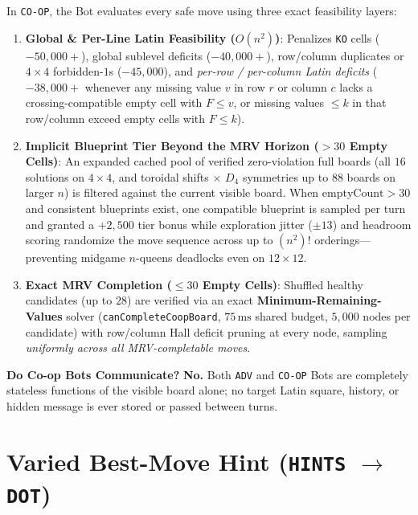 \documentclass[10pt,a4paper]{article}
\theoremstyle{remark}
\begin{document}
In \texttt{CO-OP}, the Bot evaluates every safe move using three exact feasibility layers:
\begin{enumerate}[nosep]
  \item \textbf{Global \& Per-Line Latin Feasibility ($O(n^2)$)}: Penalizes \texttt{KO} cells ($-50{,}000+$), global sublevel deficits ($-40{,}000+$), row/column duplicates or $4\times 4$ forbidden-$1$s ($-45{,}000$), and \emph{per-row / per-column Latin deficits} ($-38{,}000+$ whenever any missing value $v$ in row $r$ or column $c$ lacks a crossing-compatible empty cell with $F \le v$, or missing values $\le k$ in that row/column exceed empty cells with $F \le k$).
  \item \textbf{Implicit Blueprint Tier Beyond the MRV Horizon ($> 30$ Empty Cells)}: An expanded cached pool of verified zero-violation full boards (all $16$ solutions on $4\times 4$, and toroidal shifts $\times$ $D_4$ symmetries up to $88$ boards on larger $n$) is filtered against the current visible board. When $\mathrm{emptyCount} > 30$ and consistent blueprints exist, one compatible blueprint is sampled per turn and granted a $+2{,}500$ tier bonus while exploration jitter ($\pm 13$) and headroom scoring randomize the move sequence across up to $(n^2)!$ orderings---preventing midgame $n$-queens deadlocks even on $12 \times 12$.
  \item \textbf{Exact MRV Completion ($\le 30$ Empty Cells)}: Shuffled healthy candidates (up to $28$) are verified via an exact \textbf{Minimum-Remaining-Values} solver (\texttt{canComplete\allowbreak CoopBoard}, $75\,\mathrm{ms}$ shared budget, $5{,}000$ nodes per candidate) with row/column Hall deficit pruning at every node, sampling \emph{uniformly across all MRV-completable moves}.
\end{enumerate}

\textbf{Do Co-op Bots Communicate?} \textbf{No.} Both \texttt{ADV} and \texttt{CO-OP} Bots are completely stateless functions of the visible board alone; no target Latin square, history, or hidden message is ever stored or passed between turns.

\section{\texorpdfstring{Varied Best-Move Hint (\texttt{HINTS} $\to$ \texttt{DOT})}{Varied Best-Move Hint (HINTS -> DOT)}}
\end{document}
